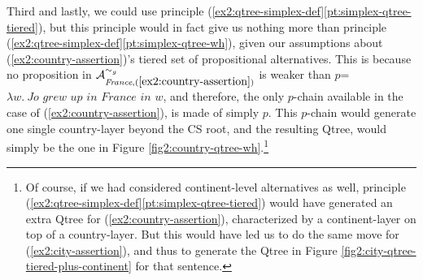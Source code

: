 \begin{exe}
	\label{ex2:country-gran-alt2}
\end{exe} 

Third and lastly, we could use principle (\ref{ex2:qtree-simplex-def}\ref{pt:simplex-qtree-tiered}), but this principle would in fact give us nothing more than principle (\ref{ex2:qtree-simplex-def}\ref{pt:simplex-qtree-wh}), given our assumptions about (\ref{ex2:country-assertion})'s tiered set of propositional alternatives. This is because no proposition in $\mathcal{A}_{\textit{France}, (\ref{ex2:country-assertion})}^{\sim_g}$ is weaker than $p$=\textit{$\lambda w. \ \textit{Jo grew up in France in $w$}$}, and therefore, the only $p$-chain available in the case of (\ref{ex2:country-assertion}), is made of simply $p$. This $p$-chain would generate one single country-layer beyond the CS root, and the resulting Qtree, would simply be the one in Figure \ref{fig2:country-qtree-wh}.\footnote{Of course, if we had considered continent-level alternatives as well, principle (\ref{ex2:qtree-simplex-def}\ref{pt:simplex-qtree-tiered}) would have generated an extra Qtree for (\ref{ex2:country-assertion}), characterized by a continent-layer on top of a country-layer. But this would have led us to do the same move for (\ref{ex2:city-assertion}), and thus to generate the Qtree in Figure \ref{fig2:city-qtree-tiered-plus-continent} for that sentence.}

